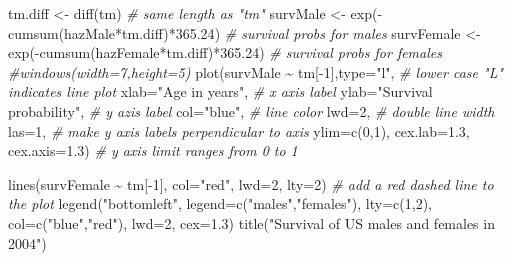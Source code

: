 \documentclass[
]{book}
\newenvironment{Shaded}{\begin{snugshade}}{\end{snugshade}}
\newcommand{\AttributeTok}[1]{\textcolor[rgb]{0.77,0.63,0.00}{#1}}
\newcommand{\CommentTok}[1]{\textcolor[rgb]{0.56,0.35,0.01}{\textit{#1}}}
\newcommand{\DecValTok}[1]{\textcolor[rgb]{0.00,0.00,0.81}{#1}}
\newcommand{\FloatTok}[1]{\textcolor[rgb]{0.00,0.00,0.81}{#1}}
\newcommand{\FunctionTok}[1]{\textcolor[rgb]{0.00,0.00,0.00}{#1}}
\newcommand{\NormalTok}[1]{#1}
\newcommand{\OtherTok}[1]{\textcolor[rgb]{0.56,0.35,0.01}{#1}}
\newcommand{\SpecialCharTok}[1]{\textcolor[rgb]{0.00,0.00,0.00}{#1}}
\newcommand{\StringTok}[1]{\textcolor[rgb]{0.31,0.60,0.02}{#1}}
\theoremstyle{definition}
\theoremstyle{definition}
\theoremstyle{definition}
\theoremstyle{definition}
\theoremstyle{remark}
\begin{document}
\begin{Shaded}
\begin{Highlighting}[]
\NormalTok{tm.diff }\OtherTok{\textless{}{-}} \FunctionTok{diff}\NormalTok{(tm)         }\CommentTok{\# same length as "tm"}
\NormalTok{survMale }\OtherTok{\textless{}{-}} \FunctionTok{exp}\NormalTok{(}\SpecialCharTok{{-}}\FunctionTok{cumsum}\NormalTok{(hazMale}\SpecialCharTok{*}\NormalTok{tm.diff)}\SpecialCharTok{*}\FloatTok{365.24}\NormalTok{)         }\CommentTok{\# survival probs for males}
\NormalTok{survFemale }\OtherTok{\textless{}{-}} \FunctionTok{exp}\NormalTok{(}\SpecialCharTok{{-}}\FunctionTok{cumsum}\NormalTok{(hazFemale}\SpecialCharTok{*}\NormalTok{tm.diff)}\SpecialCharTok{*}\FloatTok{365.24}\NormalTok{)     }\CommentTok{\# survival probs for females}
\CommentTok{\#windows(width=7,height=5)}
\FunctionTok{plot}\NormalTok{(survMale }\SpecialCharTok{\textasciitilde{}}\NormalTok{ tm[}\SpecialCharTok{{-}}\DecValTok{1}\NormalTok{],}\AttributeTok{type=}\StringTok{"l"}\NormalTok{,          }\CommentTok{\# lower case "L" indicates line plot}
     \AttributeTok{xlab=}\StringTok{"Age in years"}\NormalTok{,             }\CommentTok{\# x axis label}
     \AttributeTok{ylab=}\StringTok{"Survival probability"}\NormalTok{,     }\CommentTok{\# y azis label}
     \AttributeTok{col=}\StringTok{"blue"}\NormalTok{,                      }\CommentTok{\# line color}
     \AttributeTok{lwd=}\DecValTok{2}\NormalTok{,                           }\CommentTok{\# double line width}
     \AttributeTok{las=}\DecValTok{1}\NormalTok{,                           }\CommentTok{\# make y axis labels perpendicular to axis}
     \AttributeTok{ylim=}\FunctionTok{c}\NormalTok{(}\DecValTok{0}\NormalTok{,}\DecValTok{1}\NormalTok{), }\AttributeTok{cex.lab=}\FloatTok{1.3}\NormalTok{, }\AttributeTok{cex.axis=}\FloatTok{1.3}\NormalTok{)       }\CommentTok{\# y axis limit ranges from 0 to 1}

\FunctionTok{lines}\NormalTok{(survFemale }\SpecialCharTok{\textasciitilde{}}\NormalTok{ tm[}\SpecialCharTok{{-}}\DecValTok{1}\NormalTok{], }\AttributeTok{col=}\StringTok{"red"}\NormalTok{, }\AttributeTok{lwd=}\DecValTok{2}\NormalTok{, }\AttributeTok{lty=}\DecValTok{2}\NormalTok{)    }\CommentTok{\# add a red dashed line to the plot}
\FunctionTok{legend}\NormalTok{(}\StringTok{"bottomleft"}\NormalTok{, }\AttributeTok{legend=}\FunctionTok{c}\NormalTok{(}\StringTok{"males"}\NormalTok{,}\StringTok{"females"}\NormalTok{),}
       \AttributeTok{lty=}\FunctionTok{c}\NormalTok{(}\DecValTok{1}\NormalTok{,}\DecValTok{2}\NormalTok{), }\AttributeTok{col=}\FunctionTok{c}\NormalTok{(}\StringTok{"blue"}\NormalTok{,}\StringTok{"red"}\NormalTok{), }\AttributeTok{lwd=}\DecValTok{2}\NormalTok{, }\AttributeTok{cex=}\FloatTok{1.3}\NormalTok{)}
\FunctionTok{title}\NormalTok{(}\StringTok{"Survival of US males and females in 2004"}\NormalTok{)}
\end{Highlighting}
\end{Shaded}
\end{document}
